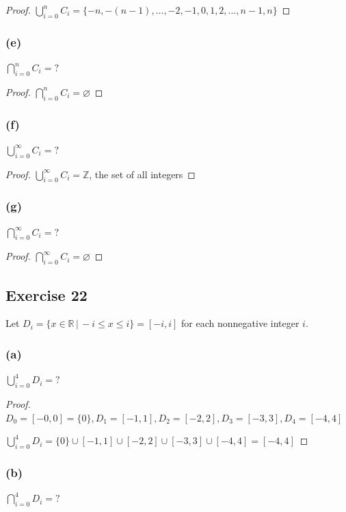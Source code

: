\documentclass[14pt]{extarticle}
\newcommand{\es}{\varnothing}
\newcommand{\dps}{\displaystyle}
\newcommand{\R}{\mathbb{R}}
\newcommand{\Z}{\mathbb{Z}}
\begin{document}
\begin{proof}
\(\dps \bigcup_{i=0}^{n}C_i = \{-n, -(n-1), \ldots, -2, -1, 0, 1, 2, \ldots, n-1, n\}\)
\end{proof}

\subsubsection{(e)}
\(\dps \bigcap_{i=0}^{n}C_i = ?\)

\begin{proof}
\(\dps \bigcap_{i=0}^{n}C_i = \es\)
\end{proof}

\subsubsection{(f)}
\(\dps \bigcup_{i=0}^{\infty}C_i = ?\)

\begin{proof}
\(\dps \bigcup_{i=0}^{\infty}C_i = \Z\), the set of all integers
\end{proof}

\subsubsection{(g)}
\(\dps \bigcap_{i=0}^{\infty}C_i = ?\)

\begin{proof}
\(\dps \bigcap_{i=0}^{\infty}C_i = \es\)
\end{proof}

\subsection{Exercise 22}
Let \(D_i = \{x \in \R \,|\, -i \leq x \leq i\} = [-i, i]\) for each nonnegative integer $i$.

\subsubsection{(a)}
\(\dps \bigcup_{i=0}^{4}D_i = ?\)

\begin{proof}
\(D_0 = [-0, 0] = \{0\}, D_1 = [-1, 1], D_2 = [-2, 2], D_3 = [-3, 3], D_4 = [-4, 4]\)

\(\dps \bigcup_{i=0}^{4}D_i = \{0\} \cup [-1, 1] \cup [-2, 2] \cup [-3, 3] \cup [-4, 4] = [-4, 4]\)
\end{proof}

\subsubsection{(b)}
\(\dps \bigcap_{i=0}^{4}D_i = ?\)
\end{document}
